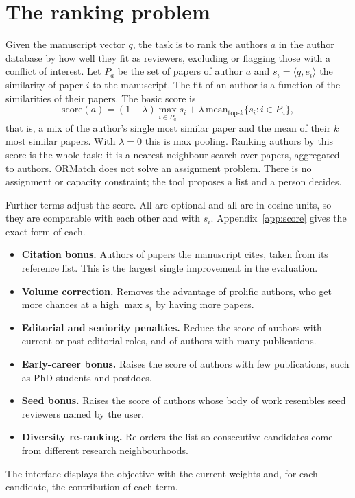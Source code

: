 \documentclass[11pt]{article}
\begin{document}
\section{The ranking problem}
Given the manuscript vector $q$, the task is to rank the authors $a$ in the author database by how well they fit as reviewers, excluding or flagging those with a conflict of interest. Let $P_a$ be the set of papers of author $a$ and $s_i = \langle q, e_i\rangle$ the similarity of paper $i$ to the manuscript. The fit of an author is a function of the similarities of their papers. The basic score is
\[
  \mathrm{score}(a) = (1-\lambda)\max_{i\in P_a} s_i + \lambda\,\mathrm{mean}_{\text{top-}k}\{s_i : i\in P_a\},
\]
that is, a mix of the author's single most similar paper and the mean of their $k$ most similar papers. With $\lambda=0$ this is max pooling. Ranking authors by this score is the whole task: it is a nearest-neighbour search over papers, aggregated to authors. ORMatch does not solve an assignment problem. There is no assignment or capacity constraint; the tool proposes a list and a person decides.

Further terms adjust the score. All are optional and all are in cosine units, so they are comparable with each other and with $s_i$. Appendix~\ref{app:score} gives the exact form of each.
\begin{itemize}
\item \textbf{Citation bonus.} Authors of papers the manuscript cites, taken from its reference list. This is the largest single improvement in the evaluation.
\item \textbf{Volume correction.} Removes the advantage of prolific authors, who get more chances at a high $\max s_i$ by having more papers.
\item \textbf{Editorial and seniority penalties.} Reduce the score of authors with current or past editorial roles, and of authors with many publications.
\item \textbf{Early-career bonus.} Raises the score of authors with few publications, such as PhD students and postdocs.
\item \textbf{Seed bonus.} Raises the score of authors whose body of work resembles seed reviewers named by the user.
\item \textbf{Diversity re-ranking.} Re-orders the list so consecutive candidates come from different research neighbourhoods.
\end{itemize}
The interface displays the objective with the current weights and, for each candidate, the contribution of each term.
\end{document}

